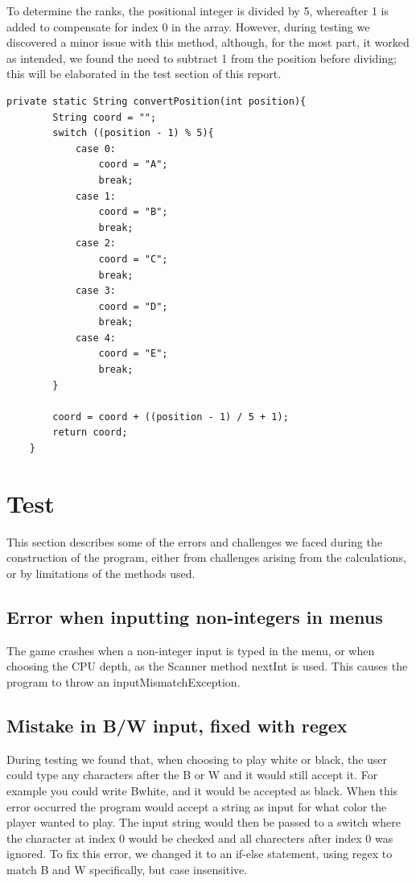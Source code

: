 \documentclass[12pt, a4paper]{article}
\begin{document}
	To determine the ranks, the positional integer is divided by 5, whereafter 1 is added to compensate for index 0 in the array.
	However, during testing we discovered a minor issue with this method, although, for the most part, it worked as intended, we found the need to subtract 1 from the position before dividing; this will be elaborated in the test section of this report.
	
	\begin{lstlisting}[style=JavaStyle]
    private static String convertPosition(int position){
		String coord = "";
		switch ((position - 1) % 5){
			case 0:
				coord = "A";
				break;
			case 1:
				coord = "B";
				break;
			case 2:
				coord = "C";
				break;
			case 3:
				coord = "D";
				break;
			case 4:
				coord = "E";
				break;
		}
		
		coord = coord + ((position - 1) / 5 + 1);
		return coord;
	}
	\end{lstlisting}
	\vspace{10mm}

	\section{Test}
	This section describes some of the errors and challenges we faced during the construction of the program, either from challenges arising from the calculations, or by limitations of the methods used.
	
	\subsection{Error when inputting non-integers in menus}
	The game crashes when a non-integer input is typed in the menu, or when choosing the CPU depth, as the Scanner method nextInt is used. This causes the program to throw an inputMismatchException.
	
	\subsection{Mistake in B/W input, fixed with regex}
	During testing we found that, when choosing to play white or black, the user could type any characters after the B or W and it would still accept it. For example you could write Bwhite, and it would be accepted as black.
	When this error occurred the program would accept a string as input for what color the player wanted to play. The input string would then be passed to a switch where the character at index 0 would be checked and all charecters after index 0 was ignored.
	To fix this error, we changed it to an if-else statement, using regex to match B and W specifically, but case insensitive.
	
\end{document}
